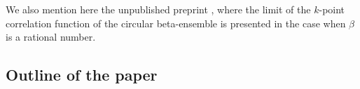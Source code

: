 \documentclass[12pt]{article}
\theoremstyle{definition} %
\theoremstyle{remark} %
\newcommand{\Sineb}{\operatorname{Sine}_{\beta}}
\newcommand{\benedek}[1]{\textcolor{red}{\tt{#1}}}
\newcommand{\yahui}[1]{\textcolor{blue}{\tt{#1}}}
\begin{document}
We also mention here the unpublished preprint  \cite{okounkov1997}, where the limit of the $k$-point correlation function of the circular beta-ensemble is presented in the case when $\beta$ is a rational number. 












\subsection*{Outline of the paper}
\end{document}
